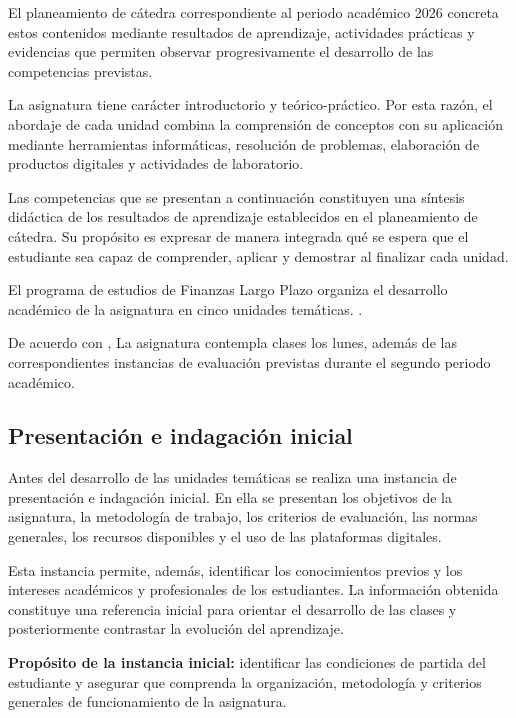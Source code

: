 \documentclass[12pt,a4paper]{article}
\begin{document}
El planeamiento de cátedra correspondiente al periodo académico 2026 concreta estos contenidos mediante resultados de aprendizaje, actividades prácticas y evidencias que permiten observar progresivamente el desarrollo de las competencias previstas.\parencite{armoa2026planeamiento}

La asignatura tiene carácter introductorio y teórico-práctico. Por esta razón, el abordaje de cada unidad combina la comprensión de conceptos con su aplicación mediante herramientas informáticas, resolución de problemas, elaboración de productos digitales y actividades de laboratorio.\parencite{uaProgramaFinanzasLargoPlazo}

Las competencias que se presentan a continuación constituyen una síntesis didáctica de los resultados de aprendizaje establecidos en el planeamiento de cátedra. Su propósito es expresar de manera integrada qué se espera que el estudiante sea capaz de comprender, aplicar y demostrar al finalizar cada unidad.

El programa de estudios de Finanzas Largo Plazo organiza el desarrollo
académico de la asignatura en cinco unidades temáticas.
\parencite{uaProgramaFinanzasLargoPlazo}.

De acuerdo con \textcite{armoa2026planeamiento},
La asignatura contempla clases los lunes, además de las correspondientes instancias de evaluación previstas durante el segundo periodo académico.

\subsection{Presentación e indagación inicial}

Antes del desarrollo de las unidades temáticas se realiza una instancia de presentación e indagación inicial. En ella se presentan los objetivos de la asignatura, la metodología de trabajo, los criterios de evaluación, las normas generales, los recursos disponibles y el uso de las plataformas digitales.\parencite{armoa2026planeamiento}

Esta instancia permite, además, identificar los conocimientos previos y los intereses académicos y profesionales de los estudiantes. La información obtenida constituye una referencia inicial para orientar el desarrollo de las clases y posteriormente contrastar la evolución del aprendizaje.

\textbf{Propósito de la instancia inicial:} identificar las condiciones de partida del estudiante y asegurar que comprenda la organización, metodología y criterios generales de funcionamiento de la asignatura.
\end{document}
